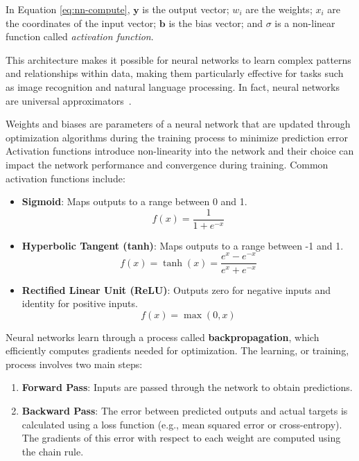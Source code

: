 In Equation \ref{eq:nn-compute}, \(\mathbf{y}\) is the output vector; \(w_i\) are the weights; \(x_i\) are the coordinates of the input vector; \(\mathbf{b}\) is the bias vector; and \(\sigma\) is a non-linear function called \textit{activation function}.

This architecture makes it possible for neural networks to learn complex patterns and relationships within data, making them particularly effective for tasks such as image recognition and natural language processing. In fact, neural networks are universal approximators~\citep{HORNIK1989359,cybenko89}.

Weights and biases are parameters of a neural network that are updated through optimization algorithms during the training process to minimize prediction error Activation functions introduce non-linearity into the network and their choice can impact the network performance and convergence during training. Common activation functions include:

\begin{itemize}
    \item \textbf{Sigmoid}: Maps outputs to a range between 0 and 1.
    \[
    f(x) = \frac{1}{1 + e^{-x}}
    \]
    
    \item \textbf{Hyperbolic Tangent (tanh)}: Maps outputs to a range between -1 and 1.
    \[
    f(x) = \tanh(x) = \frac{e^x - e^{-x}}{e^x + e^{-x}}
    \]
    
    \item \textbf{Rectified Linear Unit (ReLU)}: Outputs zero for negative inputs and identity for positive inputs.
    \[
    f(x) = \max(0, x)
    \]
\end{itemize}

Neural networks learn through a process called \textbf{backpropagation}, which efficiently computes gradients needed for optimization. The learning, or training, process involves two main steps: 

\begin{enumerate}
    \item \textbf{Forward Pass}: Inputs are passed through the network to obtain predictions.
    \item \textbf{Backward Pass}: The error between predicted outputs and actual targets is calculated using a loss function (e.g., mean squared error or cross-entropy). The gradients of this error with respect to each weight are computed using the chain rule.
\end{enumerate}

